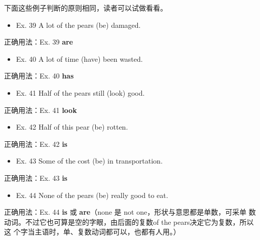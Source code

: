 下面这些例子判断的原则相同，读者可以试做看看。
\begin{mybox}

\begin{itemize}
\item   Ex. 39 A lot of the pears (be) damaged.
\end{itemize}

\tcblower

正确用法：Ex. 39 \textbf{are}
\end{mybox}

\begin{mybox}

\begin{itemize}
\item   Ex. 40 A lot of time (have) been wasted.
\end{itemize}

\tcblower

正确用法：Ex. 40 \textbf{has}
\end{mybox}

\begin{mybox}

\begin{itemize}
\item   Ex. 41 Half of the pears still (look) good.
\end{itemize}

\tcblower

正确用法：Ex. 41 \textbf{look}
\end{mybox}


\begin{mybox}

\begin{itemize}
\item   Ex. 42 Half of this pear (be) rotten.
\end{itemize}

\tcblower

正确用法：Ex. 42 \textbf{is}
\end{mybox}

\begin{mybox}
\begin{itemize}
\item   Ex. 43 Some of the cost (be) in transportation.
\end{itemize}

\tcblower

正确用法：Ex. 43 \textbf{is}

\end{mybox}


\begin{mybox}

\begin{itemize}
\item   Ex. 44 None of the pears (be) really good to eat.
\end{itemize}

\tcblower

正确用法：Ex. 44 \textbf{is} 或 \textbf{are}（none 是 not one，形状与意思都是单数，可采单
数动词。不过它也可算是空的字眼，由后面的复数of the pears决定它为复数，所以这
个字当主语时，单、复数动词都可以，也都有人用。）
\end{mybox}

